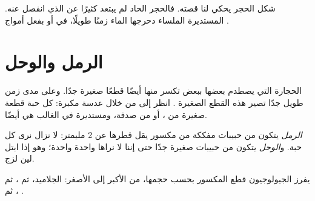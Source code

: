 \begin{remark}\label{rem:g3:stones-pebbles-sand:shape}
شكل الحجر يحكي لنا قصته. فالحجر الحاد لم يبتعد كثيرًا عن  الذي
انفصل عنه.  المستديرة الملساء دحرجها الماء زمنًا طويلًا، في 
أو بفعل أمواج .
\end{remark}

\section{الرمل والوحل}

الحجارة  التي يصطدم بعضها ببعض تكسر منها أيضًا قطعًا صغيرة جدًا.
وعلى مدى زمن طويل جدًا تصير هذه القطع الصغيرة . انظر إلى  من
خلال عدسة مكبرة: كل حبة قطعة صغيرة من ، أو من صدفة، ومستديرة في
الغالب هي أيضًا.

\begin{definition}\label{def:g3:stones-pebbles-sand:sand}
\emph{الرمل} يتكون من حبيبات مفككة من  مكسور يقل قطرها
عن 2 مليمتر: لا نزال نرى كل حبة. و\emph{الوحل} يتكون من
حبيبات صغيرة جدًا حتى إننا لا نراها واحدة واحدة؛ وهو إذا ابتل لين
لزج.
\end{definition}

يفرز الجيولوجيون قطع  المكسور بحسب حجمها، من الأكبر إلى الأصغر:
الجلاميد، ثم  ، ثم ، ثم .

